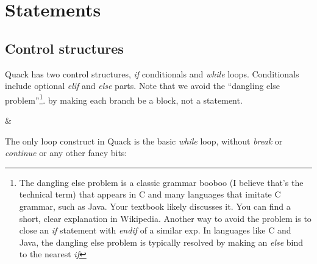 \documentclass[11pt]{article}
\begin{document}

\section{Statements}

\subsection{Control structures}

Quack has two control structures, \emph{if} conditionals and
\emph{while} loops.  Conditionals include optional \emph{elif} and
\emph{else} parts.  Note that we avoid the ``dangling else
problem''\footnote{The dangling else problem is a classic grammar
  booboo (I believe that's the technical term) that appears in C and
  many languages that imitate C grammar, such as Java.  Your textbook
  likely discusses it.  You can find a short, clear explanation in
  Wikipedia. Another way to avoid the problem is to close an \emph{if}
  statement with \emph{endif} of a similar exp.  In languages like C and Java, the dangling else problem
  is typically resolved by making an \emph{else} bind to the nearest
  \emph{if}}. 
by making each branch be a block, not a statement.  

\begin{grammar}
 & 
   ~~  
   \newline
   \newline
\end{grammar}

The only loop construct in Quack is the basic  \emph{while} loop, 
without  \emph{break} or \emph{continue} or any other fancy bits:
\end{document}
